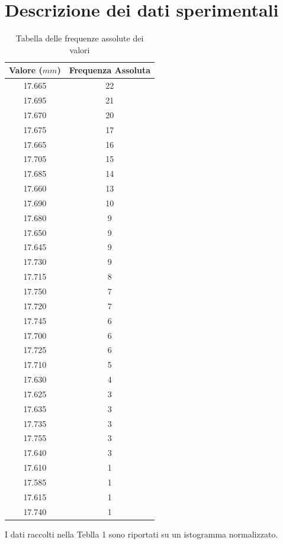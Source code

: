 \documentclass[11pt]{article}
\begin{document}
\section{Descrizione dei dati sperimentali}
\begin{table}[H]
\centering
\begin{tabular}{|c|c|}
\hline
\textbf{Valore ($mm$)} & \textbf{Frequenza Assoluta} \\
\hline
17.665 & 22 \\
17.695 & 21 \\
17.670 & 20 \\
17.675 & 17 \\
17.665 & 16 \\
17.705 & 15 \\
17.685 & 14 \\
17.660 & 13 \\
17.690 & 10 \\
17.680 & 9 \\
17.650 & 9 \\
17.645 & 9 \\
17.730 & 9 \\
17.715 & 8 \\
17.750 & 7 \\
17.720 & 7 \\
17.745 & 6 \\
17.700 & 6 \\
17.725 & 6 \\
17.710 & 5 \\
17.630 & 4 \\
17.625 & 3 \\
17.635 & 3 \\
17.735 & 3 \\
17.755 & 3 \\
17.640 & 3 \\
17.610 & 1 \\
17.585 & 1 \\
17.615 & 1 \\
17.740 & 1 \\
\hline
\end{tabular}
\caption{Tabella delle frequenze assolute dei valori}
\label{tab:frequenze_assolute}
\end{table}

I dati raccolti nella Teblla 1 sono riportati su un istogramma normalizzato. 
\end{document}
